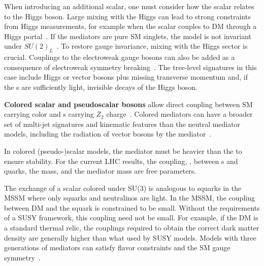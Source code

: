 When introducing an additional scalar, one must consider how the scalar relates to the Higgs boson. Large mixing with the Higgs can lead to strong constraints from Higgs measurements, for example when the scalar couples to DM through a Higgs portal~\cite{Berlin:2014cfa}. %
If the mediators are pure SM singlets, the model is not invariant under $SU(2)_L$~\cite{Bell:2016ekl}. 
To restore gauge invariance, mixing with the Higgs sector is crucial. 
Couplings to the electroweak gauge bosons can also be added as a consequence of electroweak symmetry breaking~\cite{Bauer:2016gys,Englert:2016joy}. The tree-level signatures in this case include Higgs or vector bosons plus missing transverse momentum and, if the {\IP}s are sufficiently light, invisible decays of the Higgs boson.


\textbf{Colored scalar and pseudoscalar bosons} allow direct coupling between SM carrying color and {\IP}s carrying $Z_2$ charge~\cite{Bai:2013iqa, Papucci:2014iwa, An:2013xka, Bell:2012rg}. Colored mediators can have a broader set of multi-jet signatures and kinematic features than the neutral mediator models, including the radiation of vector bosons by the mediator~\cite{Bell:2012rg}. 

In colored (pseudo-)scalar models, the mediator must be heavier than the \IP to ensure \IP stability. 
For the current LHC results, the coupling, \gdmq, between {\IP}s and quarks, the \IP mass, and the mediator mass are free parameters. 

The exchange of a scalar colored under SU(3) is analogous to squarks in the MSSM where only squarks and neutralinos are light.
In the MSSM, the coupling between DM and the squark is constrained to be small\cite{Abercrombie:2015wmb}.
Without the requirements of a SUSY framework, this coupling need not be small. 
For example, if the DM is a standard thermal relic, the couplings required to obtain the correct dark matter density are generally higher than what used by SUSY models.
Models with three generations of mediators can satisfy flavor constraints and the SM gauge symmetry~\cite{Ko:2016zxg}. 

